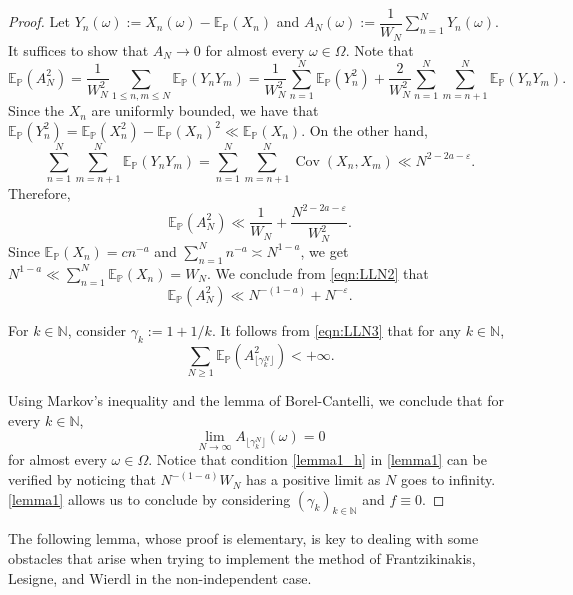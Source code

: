\documentclass[11pt]{amsart}
\numberwithin{equation}{section}
\theoremstyle{definition}
\theoremstyle{plain}
\newcommand{\N}{{\mathbb N}}
\newcommand{\Cov}{\operatorname{Cov}}
\begin{document}
\begin{proof}
Let $Y_n(\omega):=X_n(\omega)-\mathbb{E}_{\mathbb{P}}(X_n)$ and $\displaystyle A_N(\omega):=\dfrac{1}{W_N}\sum_{n=1}^N Y_n(\omega).$ It suffices to show that $A_N\to 0$ for almost every $\omega \in \Omega$. Note that
    \begin{equation}
    \mathbb{E}_{\mathbb{P}}(A_N^2)=\dfrac{1}{W_N^2}\sum_{1\leq n, m\leq N}\mathbb{E}_{\mathbb{P}}(Y_{n}Y_{m})=\dfrac{1}{W_N^2}\sum_{n=1}^{N}\mathbb{E}_{\mathbb{P}}(Y_n^2)+\dfrac{2}{W_N^2}\sum_{n=1}^{N}\sum_{m=n+1}^{N}\mathbb{E}_{\mathbb{P}}(Y_n Y_m).\label{eqn:LLN1}
\end{equation}
Since the $X_n$ are uniformly bounded, we have that $\mathbb{E}_{\mathbb{P}}(Y_n^2)=\mathbb{E}_{\mathbb{P}}(X_n^2)-\mathbb{E}_{\mathbb{P}}(X_n)^2\ll \mathbb{E}_{\mathbb{P}}(X_n).$ On the other hand,
$$\sum_{n=1}^N\sum_{m=n+1}^N\mathbb{E}_{\mathbb{P}}(Y_{n}Y_{m})=\sum_{n=1}^N\sum_{m=n+1}^N\Cov(X_{n},X_{m})\ll N^{2-2a-\varepsilon}.$$ 
Therefore,\begin{equation}
    \mathbb{E}_{\mathbb{P}}(A_N^2)\ll \dfrac{1}{W_N}+\dfrac{{N^{2-2a-\varepsilon}}}{W_N^2}.\label{eqn:LLN2}
\end{equation}
Since $\mathbb{E}_{\mathbb{P}}(X_n)=cn^{-a}$ and $\sum_{n=1}^N n^{-a}\asymp N^{1-a}$, we get $N^{1-a}\ll \sum_{n=1}^N\mathbb{E}_{\mathbb{P}}(X_n)=W_N$. We conclude from \eqref{eqn:LLN2} that
\begin{equation}
    \mathbb{E}_{\mathbb{P}}(A_N^2)\ll N^{-(1-a)}+N^{-\varepsilon}.\label{eqn:LLN3}
\end{equation}

For $k\in\N$, consider $\gamma_k:=1+1/k$. It follows from \eqref{eqn:LLN3} that for any $k\in \N$, 
\[\sum_{N\geq 1}\mathbb{E}_{\mathbb{P}}(A_{\lfloor\gamma_k^{N}\rfloor}^2)<+\infty.\]

Using Markov's inequality and the lemma of Borel-Cantelli, we conclude that for every $k\in \N$, 
\begin{equation}
    \lim_{N\to \infty}A_{\lfloor\gamma_k^{N}\rfloor}(\omega)=0\label{A_N}
\end{equation}
for almost every $\omega\in \Omega$. Notice that condition \eqref{lemma1_h} in \cref{lemma1} can be verified by noticing that $N^{-(1-a)} W_N $ has a positive limit as $N$ goes to infinity. \cref{lemma1} allows us to conclude by considering $(\gamma_k)_{k\in\N}$ and $f\equiv 0$.
\end{proof}

The following lemma, whose proof is elementary, is key to dealing with some obstacles that arise when trying to implement the method of Frantzikinakis, Lesigne, and Wierdl \cite{Frantzikinakis_Lesigne_Wierdl} in the non-independent case.
\end{document}
